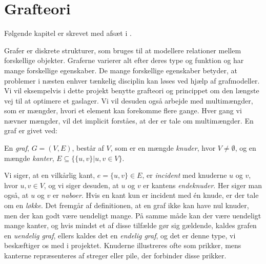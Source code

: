 \chapter{Grafteori} \label{kap:grafteori}
Følgende kapitel er skrevet med afsæt i \citep{dmat}.

Grafer er diskrete strukturer, som bruges til at modellere relationer mellem forskellige objekter.  Graferne varierer alt efter deres type og funktion og har mange forskellige egenskaber. De mange forskellige egenskaber betyder, at problemer i næsten enhver tænkelig disciplin kan løses ved hjælp af grafmodeller. Vi vil eksempelvis i dette projekt benytte grafteori og princippet om den længste vej til at optimere et gaslager. Vi vil desuden også arbejde med multimængder, som er mængder, hvori et element kan forekomme flere gange. Hver gang vi nævner mængder, vil det implicit forståes, at der er tale om multimængder. En graf er givet ved:

\begin{defn}[Graf] \label{def:graf}
En \emph{graf}, $G = (V,E)$, består af $V$, som er en mængde \emph{knuder}, hvor $V \neq \emptyset$, og en mængde \emph{kanter}, $E \subseteq \{\{u,v\}|u,v \in V \}$.
\end{defn}

Vi siger, at en vilkårlig kant, $e = \{u,v\} \in E$, er \emph{incident} med knuderne $u$ og $v$, hvor $u, v \in V$, og vi siger desuden, at $u$ og $v$ er kantens \emph{endeknuder}. Her siger man også, at $u$ og $v$ er \emph{naboer}. 
Hvis en kant kun er incident med én knude, er der tale om en \emph{løkke}.
Det fremgår af definitionen, at en graf ikke kan have nul knuder, men der kan godt være uendeligt mange. På samme måde kan der være uendeligt mange kanter, og hvis mindst et af disse tilfælde gør sig gældende, kaldes grafen en \emph{uendelig graf}, ellers kaldes det en \emph{endelig graf}, og det er denne type, vi beskæftiger os med i projektet.
Knuderne illustreres ofte som prikker, mens kanterne repræsenteres af streger eller pile, der forbinder disse prikker. 















